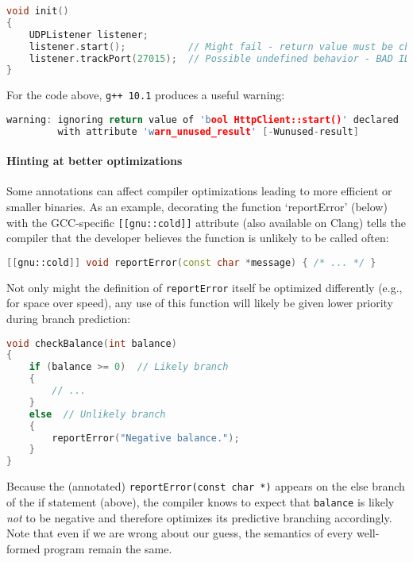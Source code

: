 \documentclass[twoside,10pt,letterpaper,usenames]{newstyle-PearsonGeneric-7-38}
\begin{document}
\begin{lstlisting}[language=C++]
void init()
{
    UDPListener listener;
    listener.start();           // Might fail - return value must be checked!
    listener.trackPort(27015);  // Possible undefined behavior - BAD IDEA!
}
\end{lstlisting}
    

For the code above, \texttt{g++ 10.1} produces a useful warning:

\begin{lstlisting}[language=C++]
warning: ignoring return value of 'bool HttpClient::start()' declared
         with attribute 'warn_unused_result' [-Wunused-result]
\end{lstlisting}
    

\paragraph[Hinting at better optimizations]{Hinting at better optimizations}\label{hinting-at-better-optimizations}

Some annotations can affect compiler optimizations leading to more
efficient or smaller binaries. As an example, decorating the function
`reportError' (below) with the GCC-specific \texttt{[[gnu::cold]]}
attribute (also available on Clang) tells the compiler that the
developer believes the function is unlikely to be called often:

\begin{lstlisting}[language=C++]
[[gnu::cold]] void reportError(const char *message) { /* ... */ }
\end{lstlisting}
    

Not only might the definition of \texttt{reportError} itself be
optimized differently (e.g., for space over speed), any use of this
function will likely be given lower priority during branch prediction:

\begin{lstlisting}[language=C++]
void checkBalance(int balance)
{
    if (balance >= 0)  // Likely branch
    {
        // ...
    }
    else  // Unlikely branch
    {
        reportError("Negative balance.");
    }
}
\end{lstlisting}
    

Because the (annotated) \texttt{reportError(const char *)} appears on
the else branch of the if statement (above), the compiler knows to
expect that \texttt{balance} is likely \emph{not} to be negative and
therefore optimizes its predictive branching accordingly. Note that even
if we are wrong about our guess, the semantics of every well-formed
program remain the same.
\end{document}
